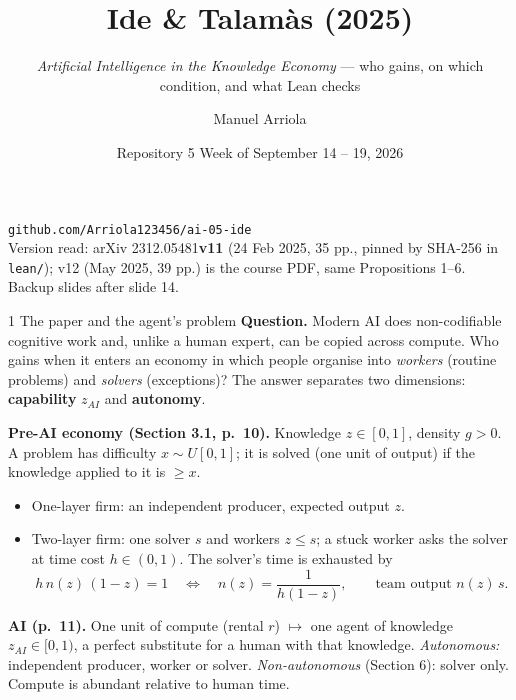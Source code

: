 \documentclass[aspectratio=169,11pt]{beamer}
\title{Ide \& Talamàs (2025)}
\subtitle{\emph{Artificial Intelligence in the Knowledge Economy} --- who gains, on which condition, and what Lean checks}
\author{Manuel Arriola}
\date{Repository 5 \textperiodcentered{} Week of September 14 -- 19, 2026}
\begin{document}
\begin{frame}[plain]
  \titlepage
  \begin{center}\small
    \texttt{github.com/Arriola123456/ai-05-ide}\\[2pt]
    \footnotesize Version read: arXiv 2312.05481\textbf{v11} (24 Feb 2025, 35 pp., pinned by SHA-256 in \texttt{lean/});
    v12 (May 2025, 39 pp.) is the course PDF, same Propositions 1--6. Backup slides after slide 14.
  \end{center}
\end{frame}

\begin{frame}{1 \textperiodcentered{} The paper and the agent's problem}
  \footnotesize
  \textbf{Question.} Modern AI does non-codifiable cognitive work and, unlike a human expert, can be copied across
  compute. Who gains when it enters an economy in which people organise into \emph{workers} (routine problems) and
  \emph{solvers} (exceptions)? The answer separates two dimensions: \textbf{capability} $z_{AI}$ and \textbf{autonomy}.

  \smallskip
  \textbf{Pre-AI economy (Section 3.1, p.\ 10).} Knowledge $z\in[0,1]$, density $g>0$. A problem has difficulty
  $x\sim U[0,1]$; it is solved (one unit of output) if the knowledge applied to it is $\ge x$.
  \begin{itemize}
    \item One-layer firm: an independent producer, expected output $z$.
    \item Two-layer firm: one solver $s$ and workers $z\le s$; a stuck worker asks the solver at time cost $h\in(0,1)$.
      The solver's time is exhausted by
      \[
        h\,n(z)\,(1-z)=1 \quad\Longleftrightarrow\quad n(z)=\frac{1}{h(1-z)},\qquad \text{team output } n(z)\,s .
      \]
  \end{itemize}
  \textbf{AI (p.\ 11).} One unit of compute (rental $r$) $\mapsto$ one agent of knowledge $z_{AI}\in[0,1)$, a perfect
  substitute for a human with that knowledge. \emph{Autonomous:} independent producer, worker or solver.
  \emph{Non-autonomous} (Section 6): solver only. Compute is abundant relative to human time.
\end{frame}
\end{document}
